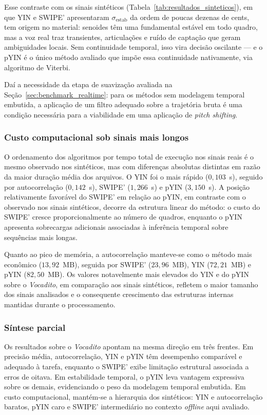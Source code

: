   Esse contraste com os sinais sintéticos
  (Tabela~\ref{tab:resultados_sinteticos}), em que YIN e SWIPE' apresentaram
  $\sigma_{\text{estab}}$ da ordem de poucas dezenas de cents, tem origem no
  material: senoides têm uma fundamental estável em todo quadro, mas a voz real
  traz transientes, articulações e ruído de captação que geram ambiguidades
  locais. Sem continuidade temporal, isso vira decisão oscilante --- e o pYIN é
  o único método avaliado que impõe essa continuidade nativamente, via algoritmo
  de Viterbi.

  Daí a necessidade da etapa de suavização avaliada na
  Seção~\ref{sec:benchmark_realtime}: para os métodos sem modelagem temporal
  embutida, a aplicação de um filtro adequado sobre a trajetória bruta é uma
  condição necessária para a viabilidade em uma aplicação de
  \textit{pitch shifting}.

  \subsubsection{Custo computacional sob sinais mais longos}

  O ordenamento dos algoritmos por tempo total de execução nos sinais reais é o
  mesmo observado nos sintéticos, mas com diferenças absolutas distintas em
  razão da maior duração média dos arquivos. O YIN foi o mais rápido
  ($0{,}103$~s), seguido por autocorrelação ($0{,}142$~s), SWIPE' ($1{,}266$~s)
  e pYIN ($3{,}150$~s). A posição relativamente favorável do SWIPE' em relação
  ao pYIN, em contraste com o observado nos sinais sintéticos, decorre da
  estrutura linear do método: o custo do SWIPE' cresce proporcionalmente ao
  número de quadros, enquanto o pYIN apresenta sobrecargas adicionais
  associadas à inferência temporal sobre sequências mais longas.

  Quanto ao pico de memória, a autocorrelação manteve-se como o método mais
  econômico ($13{,}92$~MB), seguida por SWIPE' ($23{,}96$~MB), YIN
  ($72{,}21$~MB) e pYIN ($82{,}50$~MB). Os valores notavelmente mais elevados
  do YIN e do pYIN sobre o \textit{Vocadito}, em comparação aos sinais
  sintéticos, refletem o maior tamanho dos sinais analisados e o consequente
  crescimento das estruturas internas mantidas durante o processamento.

  \subsubsection{Síntese parcial}

  Os resultados sobre o \textit{Vocadito} apontam na mesma direção em três
  frentes. Em precisão média, autocorrelação, YIN e pYIN têm desempenho
  comparável e adequado à tarefa, enquanto o SWIPE' exibe limitação estrutural
  associada a erros de oitava. Em estabilidade temporal, o pYIN leva vantagem
  expressiva sobre os demais, evidenciando o peso da modelagem temporal
  embutida. Em custo computacional, mantém-se a hierarquia dos sintéticos: YIN
  e autocorrelação baratos, pYIN caro e SWIPE' intermediário no contexto
  \textit{offline} aqui avaliado.

